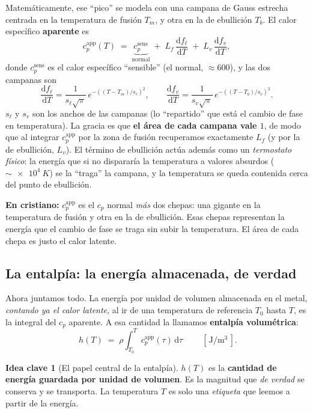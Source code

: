 \documentclass[11pt]{article}
\newcommand{\dd}{\mathrm{d}}
\newcommand{\cpapp}{c_p^{\mathrm{app}}}
\newcommand{\cpsens}{c_p^{\mathrm{sens}}}
\theoremstyle{definition}
\newtheorem{idea}{Idea clave}[section]
\theoremstyle{plain}
\newcommand{\dummies}[1]{%
  \par\smallskip\noindent
  \colorbox{yellow!18}{\parbox{\dimexpr\linewidth-2\fboxsep}{%
  \small\textbf{En cristiano:} #1}}\par\smallskip}
\begin{document}
Matemáticamente, ese ``pico'' se modela con una campana de Gauss estrecha centrada
en la temperatura de fusión $T_m$, y otra en la de ebullición $T_b$. El calor
específico \textbf{aparente} es
\begin{equation}
  \cpapp(T) \;=\; \underbrace{\cpsens}_{\text{normal}}
  \;+\; L_f\,\frac{\dd f_\ell}{\dd T}
  \;+\; L_v\,\frac{\dd f_v}{\dd T},
  \label{eq:cpapp}
\end{equation}
donde $\cpsens$ es el calor específico ``sensible'' (el normal, $\approx 600$),
y las dos campanas son
\begin{equation}
  \frac{\dd f_\ell}{\dd T}=\frac{1}{s_\ell\sqrt{\pi}}\,
    e^{-\left((T-T_m)/s_\ell\right)^2},
  \qquad
  \frac{\dd f_v}{\dd T}=\frac{1}{s_v\sqrt{\pi}}\,
    e^{-\left((T-T_b)/s_v\right)^2}.
  \label{eq:bumps}
\end{equation}
$s_\ell$ y $s_v$ son los anchos de las campanas (lo ``repartido'' que está el
cambio de fase en temperatura). La gracia es que \textbf{el área de cada campana
vale $1$}, de modo que al integrar $\cpapp$ por la zona de fusión recuperamos
exactamente $L_f$ (y por la de ebullición, $L_v$). El término de ebullición actúa
además como un \emph{termostato físico}: la energía que si no dispararía la
temperatura a valores absurdos ($\sim\!\SI{e4}{K}$) se la ``traga'' la campana, y
la temperatura se queda contenida cerca del punto de ebullición.

\dummies{$\cpapp$ es el $c_p$ normal \emph{más} dos chepas: una gigante en la
temperatura de fusión y otra en la de ebullición. Esas chepas representan la
energía que el cambio de fase se traga sin subir la temperatura. El área de cada
chepa es justo el calor latente.}

\subsection{La entalpía: la energía almacenada, de verdad}
\label{sec:entalpia}

Ahora juntamos todo. La energía por unidad de volumen almacenada en el metal,
\emph{contando ya el calor latente}, al ir de una temperatura de referencia $T_0$
hasta $T$, es la integral del $c_p$ aparente. A esa cantidad la llamamos
\textbf{entalpía volumétrica}:
\begin{equation}
  \boxed{\;h(T) \;=\; \rho \int_{T_0}^{T} \cpapp(\tau)\,\dd\tau\;}
  \qquad [\,\mathrm{J/m^3}\,].
  \label{eq:enthalpy}
\end{equation}

\begin{idea}[El papel central de la entalpía]
$h(T)$ es la \textbf{cantidad de energía guardada por unidad de volumen}. Es la
magnitud que \emph{de verdad} se conserva y se transporta. La temperatura $T$ es
solo una \emph{etiqueta} que leemos a partir de la energía.
\end{idea}
\end{document}
